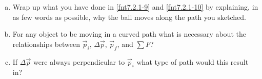 \label{fnt7.2.1-11}

\begin{enumerate}[(a)]
	\item Wrap up what you have done in \ref{fnt7.2.1-9} and \ref{fnt7.2.1-10} by explaining, in as few words as possible, why the ball moves along the path you sketched.
	\item For any object to be moving in a curved path what is necessary about the relationships between $\vec{p}_i$, $\Delta \vec{p}$, $\vec{p}_f$, and $\sum F$?
	\item If $\Delta \vec{p}$ were always perpendicular to $\vec{p}_i$ what type of path would this result in?
\end{enumerate}